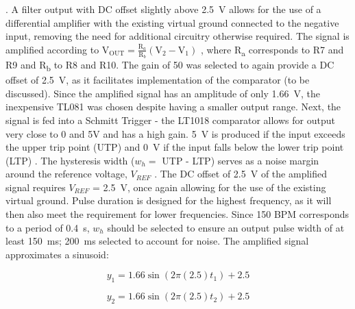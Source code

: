 \cite{filter}. A filter output with DC offset slightly above \SI{2.5}{V} allows for the use of a differential amplifier with the existing virtual ground connected to the negative input, removing the need for additional circuitry otherwise required. The signal is amplified according to $\mathrm{V}_{\mathrm{OUT}}=\frac{\mathrm{R}_{a}}{\mathrm{R}_{b}}\left(\mathrm{V}_{2}-\mathrm{V}_{1}\right)$ \cite{opamp}, where R\textsubscript{a} corresponds to R7 and R9 and R\textsubscript{b} to R8 and R10. The gain of 50 was selected to again provide a DC offset of \SI{2.5}{V}, as it facilitates implementation of the comparator (to be discussed). Since the amplified signal has an amplitude of only \SI{1.66}{V}, the inexpensive TL081 was chosen despite having a smaller output range. Next, the signal is fed into a Schmitt Trigger - the LT1018 comparator allows for output very close to 0 and 5V and has a high gain. \SI{5}{V} is produced if the input exceeds the upper trip point (UTP) and \SI{0}{V} if the input falls below the lower trip point (LTP) \cite{schmitt}. The hysteresis width ($w_h =$ UTP - LTP) serves as a noise margin around the reference voltage, $V_{REF}$ \cite{schmitt}. The DC offset of \SI{2.5}{V} of the amplified signal requires $V_{REF}$ = \SI{2.5}{V}, once again allowing for the use of the existing virtual ground. Pulse duration is designed for the highest frequency, as it will then also meet the requirement for lower frequencies. Since 150 BPM corresponds to a period of \SI{0.4}{s}, $w_h$ should be selected to ensure an output pulse width of at least \SI{150}{ms}; \SI{200}{ms} selected to account for noise. The amplified signal approximates a sinusoid:

\noindent\begin{minipage}{.5\linewidth}
\vspace{-0.35cm}
\begin{equation}
    y_1 = 1.66\sin(2\pi(2.5)t_1) + 2.5
    \label{eq:sin1}
\end{equation}
\end{minipage}%
\begin{minipage}{.5\linewidth}
\vspace{-0.35cm}
\begin{equation}
    y_2 = 1.66\sin(2\pi(2.5)t_2) + 2.5
    \label{eq:sin2}
\end{equation}
\end{minipage}

